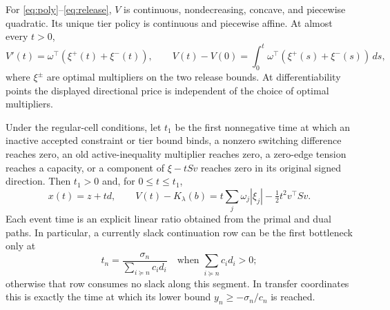 \begin{theorem}\label{thm:release}
For \eqref{eq:poly}--\eqref{eq:release}, $V$ is continuous, nondecreasing, concave, and piecewise quadratic. Its unique tier policy is continuous and piecewise affine. At almost every $t>0$,
\begin{equation}\label{eq:restriction-rent}
 V'(t)=\omega^\top(\xi^+(t)+\xi^-(t)),
 \qquad V(t)-V(0)=\int_0^t\omega^\top(\xi^+(s)+\xi^-(s))\,ds,
\end{equation}
where $\xi^\pm$ are optimal multipliers on the two release bounds. At differentiability points the displayed directional price is independent of the choice of optimal multipliers.

Under the regular-cell conditions, let $t_1$ be the first nonnegative time at which an inactive accepted constraint or tier bound binds, a nonzero switching difference reaches zero, an old active-inequality multiplier reaches zero, a zero-edge tension reaches a capacity, or a component of $\xi-tSv$ reaches zero in its original signed direction. Then $t_1>0$ and, for $0\leq t\leq t_1$,
\begin{equation}\label{eq:release-exact}
 x(t)=z+td,\qquad
 V(t)-K_\lambda(b)=t\sum_j\omega_j|\xi_j|-\tfrac12t^2 v^\top Sv.
\end{equation}
Each event time is an explicit linear ratio obtained from the primal and dual paths. In particular, a currently slack continuation row can be the first bottleneck only at
\begin{equation}\label{eq:slack-break}
 t_n=\frac{\sigma_n}{\sum_{i\succeq n}c_i d_i}
 \quad\text{when }\sum_{i\succeq n}c_i d_i>0;
\end{equation}
otherwise that row consumes no slack along this segment. In transfer coordinates this is exactly the time at which its lower bound $y_n\geq-\sigma_n/c_n$ is reached.
\end{theorem}


